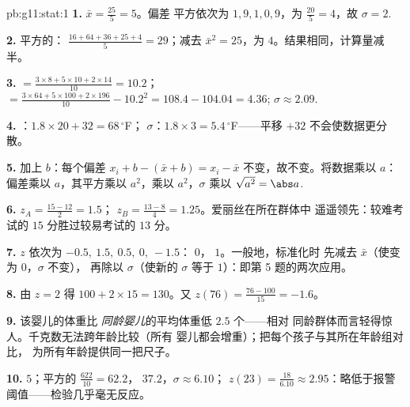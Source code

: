 \begin{solution}{pb:g11:stat:1}
\textbf{1.}  $\bar x = \frac{25}{5} = 5$。偏差
平方依次为 $1, 9, 1, 0, 9$，为 $\frac{20}{5} = 4$，故
$\sigma = 2$.

\textbf{2.} 平方的：
$\frac{16 + 64 + 36 + 25 + 4}{5} = 29$；减去
$\bar x^2 = 25$，为 $4$。结果相同，计算量减半。

\textbf{3.}  $= \frac{3 \times 8 + 5 \times 10 + 2 \times
14}{10} = 10.2$； $= \frac{3 \times 64 + 5 \times 100 +
2 \times 196}{10} - 10.2^2 = 108.4 - 104.04 = 4.36$;
$\sigma \approx 2.09$.

\textbf{4.} ：$1.8 \times 20 + 32 = 68\,^\circ$F；
$\sigma$：$1.8 \times 3 = 5.4\,^\circ$F——平移 $+32$
不会使数据更分散。

\textbf{5.} 加上 $b$：每个偏差 $x_i + b - (\bar x + b)
= x_i - \bar x$ 不变，故不变。将数据乘以
$a$：偏差乘以 $a$，其平方乘以
$a^2$，乘以 $a^2$，$\sigma$ 乘以
$\sqrt{a^2} = \abs a$.

\textbf{6.} $z_A = \frac{15 - 12}{2} = 1.5$；
$z_B = \frac{13 - 8}{4} = 1.25$。爱丽丝在所在群体中
遥遥领先：较难考试的 $15$ 分胜过较易考试的 $13$ 分。

\textbf{7.}  $z$ 依次为 $-0.5,\ 1.5,\ 0.5,\ 0,\ -1.5$：
$0$， $1$。一般地，标准化时
先减去 $\bar x$（使变为 $0$，$\sigma$ 不变），
再除以 $\sigma$（使新的 $\sigma$ 等于
$1$）：即第 5 题的两次应用。

\textbf{8.} 由 $z = 2$ 得 $100 + 2 \times 15 = 130$。又
$z(76) = \frac{76 - 100}{15} = -1.6$。

\textbf{9.} 该婴儿的体重比
\emph{同龄婴儿}的平均体重低 $2.5$ 个——相对
同龄群体而言轻得惊人。千克数无法跨年龄比较（所有
婴儿都会增重）；把每个孩子与其所在年龄组对比，
为所有年龄提供同一把尺子。

\textbf{10.}  $5$；平方的 $\frac{622}{10} = 62.2$，
 $37.2$，$\sigma \approx 6.10$；
$z(23) = \frac{18}{6.10} \approx 2.95$：略低于报警
阈值——检验几乎毫无反应。


\end{solution}
